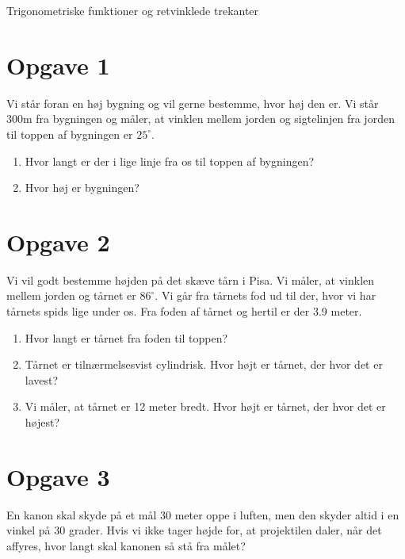 
\begin{center}
\Huge
Trigonometriske funktioner og retvinklede trekanter
\end{center}

\section*{Opgave 1}
Vi står foran en høj bygning og vil gerne bestemme, hvor høj den er. Vi står 300m fra bygningen og måler, at vinklen mellem jorden og sigtelinjen fra jorden til toppen af bygningen er $25^\circ$.
\begin{enumerate}[label=\roman*)]
\item Hvor langt er der i lige linje fra os til toppen af bygningen?
\item Hvor høj er bygningen?
\end{enumerate}

\section*{Opgave 2}
Vi vil godt bestemme højden på det skæve tårn i Pisa. Vi måler, at vinklen mellem jorden og tårnet er $86^\circ$. Vi går fra tårnets fod ud til der, hvor vi har tårnets spids lige under os. Fra foden af tårnet og hertil er der 3.9 meter. 
\begin{enumerate}[label=\roman*)]
\item Hvor langt er tårnet fra foden til toppen?
\item Tårnet er tilnærmelsesvist cylindrisk. Hvor højt er tårnet, der hvor det er lavest?
\item Vi måler, at tårnet er 12 meter bredt. Hvor højt er tårnet, der hvor det er højest?
\end{enumerate}

\section*{Opgave 3}
En kanon skal skyde på et mål 30 meter oppe i luften, men den skyder altid i en vinkel på 30 grader. Hvis vi ikke tager højde for, at projektilen daler, når det affyres, hvor langt skal kanonen så stå fra målet?

